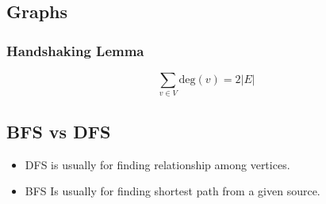 \documentclass{article}
\begin{document}
\begin{multicols*}{2}
    \subsection*{Graphs}
    \subsubsection*{Handshaking Lemma}
    \begin{equation*}
        \sum_{v \in V} \text{deg}(v) = 2|E|
    \end{equation*}

    \subsection*{BFS vs DFS}
    \begin{itemize}
        \item DFS is usually for finding relationship among vertices.
        \item BFS Is usually for finding shortest path from a given source.
    \end{itemize}


\end{multicols*}
\end{document}
